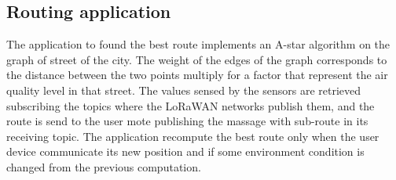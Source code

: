 \subsection*{Routing application}
The application to found the best route implements an A-star algorithm on the graph of street of the city. 
The weight of the edges of the graph corresponds to the distance between the two points multiply for a factor that represent the air quality level in that street. 
The values sensed by the sensors are retrieved subscribing the topics where the LoRaWAN networks publish them, and the route is send to the user mote publishing the massage with sub-route in its receiving topic.
The application recompute the best route only when the user device communicate its new position and if some environment condition is changed from the previous computation.

